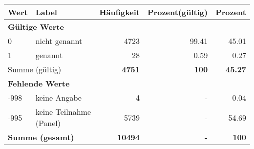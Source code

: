      \begin{longtable}{lXrrr}
     \toprule
     \textbf{Wert} & \textbf{Label} & \textbf{Häufigkeit} & \textbf{Prozent(gültig)} & \textbf{Prozent} \\
     \endhead
     \midrule
     \multicolumn{5}{l}{\textbf{Gültige Werte}}\\

     0 &
     \multicolumn{1}{X}{ nicht genannt   } &


       \num{4723} &
       \num[round-mode=places,round-precision=2]{99,41} &
         \num[round-mode=places,round-precision=2]{45,01} \\

     1 &
     \multicolumn{1}{X}{ genannt   } &


       \num{28} &
       \num[round-mode=places,round-precision=2]{0,59} &
         \num[round-mode=places,round-precision=2]{0,27} \\
     \midrule
     \multicolumn{2}{l}{Summe (gültig)} &
       \textbf{\num{4751}} &
     \textbf{100} &
       \textbf{\num[round-mode=places,round-precision=2]{45,27}} \\
     \multicolumn{5}{l}{\textbf{Fehlende Werte}}\\
       -998 &
       keine Angabe &
         \num{4} &
        - &
         \num[round-mode=places,round-precision=2]{0,04} \\
       -995 &
       keine Teilnahme (Panel) &
         \num{5739} &
        - &
         \num[round-mode=places,round-precision=2]{54,69} \\
     \midrule
     \multicolumn{2}{l}{\textbf{Summe (gesamt)}} &
          \textbf{\num{10494}} &
        \textbf{-} &
        \textbf{100} \\
     \bottomrule
     \end{longtable}
     
